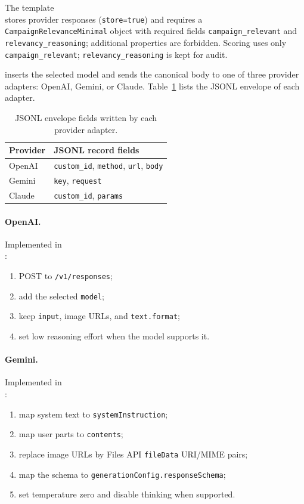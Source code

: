 The template\\
\mbox{}
stores provider responses (\texttt{store=true}) and requires a
\texttt{CampaignRelevanceMinimal} object with required fields
\texttt{campaign\_relevant} and \texttt{relevancy\_reasoning};
additional properties are forbidden. Scoring uses only
\texttt{campaign\_relevant}; \texttt{relevancy\_reasoning} is kept for audit.

\mbox{}
inserts the selected model and sends the canonical body to one of three
provider adapters: OpenAI, Gemini, or Claude. Table~\ref{tab:provider-adapters}
lists the JSONL envelope of each adapter.

\begin{table}[htbp]
\centering
\caption[Provider JSONL envelopes]{JSONL envelope fields written by each provider adapter.}
\label{tab:provider-adapters}
\begin{tabular}{@{}ll@{}}
\toprule
Provider & JSONL record fields \\
\midrule
OpenAI & \texttt{custom\_id}, \texttt{method}, \texttt{url}, \texttt{body} \\
Gemini & \texttt{key}, \texttt{request} \\
Claude & \texttt{custom\_id}, \texttt{params} \\
\bottomrule
\end{tabular}
\end{table}

\paragraph{OpenAI.}
Implemented in\\
\mbox{}:
\begin{enumerate}
    \item POST to \texttt{/v1/responses};
    \item add the selected \texttt{model};
    \item keep \texttt{input}, image URLs, and \texttt{text.format};
    \item set low reasoning effort when the model supports it.
\end{enumerate}

\paragraph{Gemini.}
Implemented in\\
\mbox{}:
\begin{enumerate}
    \item map system text to \texttt{systemInstruction};
    \item map user parts to \texttt{contents};
    \item replace image URLs by Files API \texttt{fileData} URI/MIME pairs;
    \item map the schema to \texttt{generationConfig.responseSchema};
    \item set temperature zero and disable thinking when supported.
\end{enumerate}

